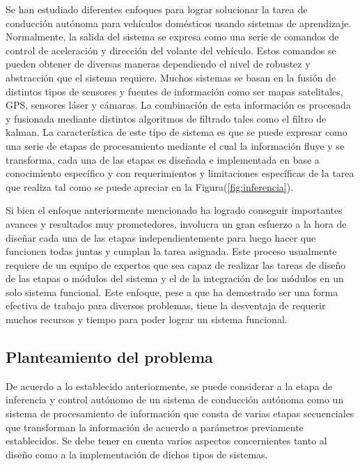 Se han estudiado diferentes enfoques para lograr solucionar la tarea de 
conducción autónoma para vehículos domésticos usando sistemas de aprendizaje. Normalmente, la salida del 
sistema se expresa como una serie de comandos de control de aceleración y dirección 
del volante del vehículo. Estos comandos se pueden obtener de diversas maneras dependiendo 
el nivel de robustez y abstracción que el sistema requiere. Muchos sistemas 
se basan en la fusión de distintos tipos de sensores y fuentes de información como ser 
mapas satelitales, GPS, sensores láser y cámaras. La combinación de esta información 
es procesada y fusionada mediante distintos algoritmos de filtrado tales como el filtro de kalman. 
La característica de este tipo de sistema es que se puede expresar como una serie de etapas 
de procesamiento mediante el cual la información fluye y se transforma, cada una de las etapas es 
diseñada e implementada en base a conocimiento específico y con requerimientos y limitaciones específicas 
de la tarea que realiza tal como se puede apreciar en la Figura(\ref{fig:inferencia}).

Si bien el enfoque anteriormente mencionado ha logrado conseguir importantes avances y resultados 
muy prometedores, involucra un gran esfuerzo a la hora de diseñar cada una de las etapas independientemente 
para luego hacer que funcionen todas juntas y cumplan la tarea asignada. Este proceso usualmente requiere 
de un equipo de expertos que sea capaz de realizar las tareas de diseño de las etapas o módulos del sistema 
y el de la integración de los módulos en un solo sistema funcional. Este enfoque, pese a que ha demostrado ser 
una forma efectiva de trabajo para diversos problemas, tiene la desventaja de requerir muchos 
recursos y tiempo para poder lograr un sistema funcional. 

%
\subsection{Planteamiento del problema} \label{sec:problema}

% 
De acuerdo a lo establecido anteriormente, se puede considerar a la etapa de inferencia y control autónomo de 
un sistema de conducción autónoma como un sistema de procesamiento de información que consta de varias etapas 
secuenciales que transforman la información de acuerdo a parámetros previamente establecidos. Se debe tener en 
cuenta varios aspectos concernientes tanto al diseño como a la implementación de dichos tipos de sistemas. 

